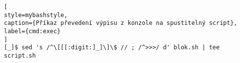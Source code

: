 \begin{lstfloat}
\begin{lstlisting}[
style=mybashstyle,
caption={Příkaz převedení výpisu z konzole na spustitelný script},
label={cmd:exec}
]
[_]$ sed 's /^\[[[:digit:]_]\]\$ // ; /^>>>/ d' blok.sh | tee script.sh
\end{lstlisting}
\end{lstfloat}